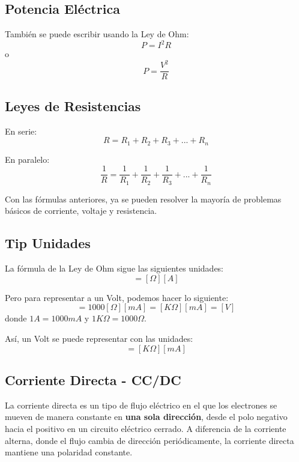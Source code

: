 \subsection{Potencia Eléctrica}
También se puede escribir usando la Ley de Ohm:
\begin{equation}
    P = I^{2}R
\end{equation}
o
\begin{equation}
    P = \frac{V^{2}}{R}
\end{equation}

\subsection{Leyes de Resistencias}
En serie:
\begin{equation}
    R = R_1 + R_2 + R_3 + ... + R_n
\end{equation}

En paralelo:
\begin{equation}
    \frac{1}{R} = \frac{1}{R_1} + \frac{1}{R_2} + \frac{1}{R_3} + ... + \frac{1}{R_n}
\end{equation}

Con las fórmulas anteriores, ya se pueden resolver la mayoría de problemas básicos de corriente, voltaje y resistencia.

\subsection{Tip Unidades}
La fórmula de la Ley de Ohm sigue las siguientes unidades:
\begin{equation}
    [V] = [\Omega][A]
\end{equation}

Pero para representar a un Volt, podemos hacer lo siguiente:
\begin{equation}
    [V] = 1000[\Omega][mA] = [K\Omega][mA] = [V]
\end{equation}
donde $1 A = 1000 mA$ y $1 K\Omega = 1000\Omega$.

Así, un Volt se puede representar con las unidades:
\begin{equation}
    [V] = [K\Omega][mA]
\end{equation}

\subsection{Corriente Directa - CC/DC}
La corriente directa es un tipo de flujo eléctrico en el que los electrones se mueven de manera constante en \textbf{una sola dirección}, desde el polo negativo hacia el positivo en un circuito eléctrico cerrado. A diferencia de la corriente alterna, donde el flujo cambia de dirección periódicamente, la corriente directa mantiene una polaridad constante.

